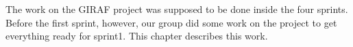 The work on the GIRAF project was supposed to be done inside the four sprints. Before the first sprint, however, our group did some work on the project to get everything ready for sprint1. This chapter describes this work.